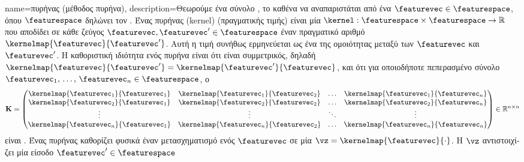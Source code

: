{name={\foreignlanguage{greek}{πυρήνας (μέθοδος πυρήνα)}}, 
	description={\foreignlanguage{greek}{Θεωρούμε ένα σύνολο} , 
		\foreignlanguage{greek}{το καθένα να αναπαριστάται από ένα}  $\featurevec \in \featurespace$, 
		\foreignlanguage{greek}{όπου $\featurespace$ δηλώνει τον} . \foreignlanguage{greek}{Ένας πυρήνας} 
		(kernel) \foreignlanguage{greek}{(πραγματικής τιμής) είναι μία}  
		$\kernel: \featurespace \times \featurespace \rightarrow \mathbb{R}$ \foreignlanguage{greek}{που αποδίδει σε κάθε ζεύγος} 
		 $\featurevec, \featurevec' \in \featurespace$ \foreignlanguage{greek}{έναν πραγματικό αριθμό 
		$\kernelmap{\featurevec}{\featurevec'}$. Αυτή η τιμή συνήθως ερμηνεύεται ως ένα}  \foreignlanguage{greek}{της 
		ομοιότητας μεταξύ των $\featurevec$ και $\featurevec'$. Η καθοριστική ιδιότητα ενός πυρήνα είναι ότι είναι
		συμμετρικός, δηλαδή $\kernelmap{\featurevec}{\featurevec'} = \kernelmap{\featurevec'}{\featurevec}$, και ότι για οποιοδήποτε πεπερασμένο 
		σύνολο}  $\featurevec_1, \,\ldots, \,\featurevec_n \in \featurespace$, \foreignlanguage{greek}{ο}  
	  	\begin{equation}
	 		\nonumber
	 		\mathbf{K} = \begin{pmatrix}
	 			\kernelmap{\featurevec_1}{\featurevec_1} & \kernelmap{\featurevec_1}{\featurevec_2} & \ldots & \kernelmap{\featurevec_1}{\featurevec_n} \\
	 			\kernelmap{\featurevec_2}{\featurevec_1} & \kernelmap{\featurevec_2}{\featurevec_2} & \ldots & \kernelmap{\featurevec_2}{\featurevec_n} \\
	 			\vdots											
	 			& \vdots & \ddots & \vdots \\
	 			\kernelmap{\featurevec_n}{\featurevec_1} & \kernelmap{\featurevec_n}{\featurevec_2} & \ldots & \kernelmap{\featurevec_n}{\featurevec_n} 
	 		\end{pmatrix} \in \mathbb{R}^{n \times n}
	 	\end{equation}
	 	\foreignlanguage{greek}{είναι} . \foreignlanguage{greek}{Ένας πυρήνας καθορίζει φυσικά έναν μετασχηματισμό ενός} 
		 $\featurevec$ \foreignlanguage{greek}{σε μία}  $\vz = \kernelmap{\featurevec}{\cdot}$. 
		\foreignlanguage{greek}{Η}  $\vz$ \foreignlanguage{greek}{αντιστοιχίζει μία είσοδο $\featurevec' \in \featurespace$ 
}}}
